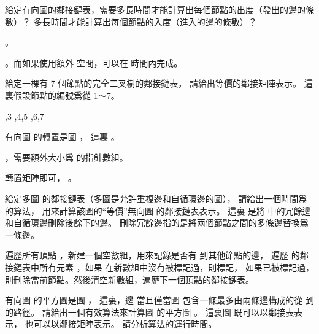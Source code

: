 \startsection[
  title={Representations of graphs},
]

\startEXERCISE
給定有向圖的鄰接鏈表，需要多長時間才能計算出每個節點的出度（發出的邊的條數）？
多長時間才能計算出每個節點的入度（進入的邊的條數）？
\stopEXERCISE

\startANSWER
{}。

。而如果使用額外  空間，可以在  時間內完成。
\stopANSWER

\startEXERCISE
給定一棵有 7 個節點的完全二叉樹的鄰接鏈表，
請給出等價的鄰接矩陣表示。
這裏假設節點的編號爲從 1～7。
\stopEXERCISE

\startANSWER
\startformulas
\startformula\startmathalignment
{} \NC {},3 \NR
{} \NC {},4,5 \NR
{} \NC {},6,7 \NR
{} \NC {} \NR
{} \NC {} \NR
{} \NC {} \NR
{} \NC {} \NR
\stopmathalignment\stopformula

\startformula\startmatrix
{}       \NR
{}       \NR
{}       \NR
{}       \NR
{}       \NR
{}       \NR
{}       \NR
\stopmatrix\stopformula
\stopformulas
\stopANSWER

\startEXERCISE
有向圖  的{\EMP 轉置}是圖 ，
這裏 。
\stopEXERCISE

\startANSWER
{}，需要額外大小爲  的指針數組。

轉置矩陣即可， 。
\stopANSWER

\startEXERCISE
給定多圖  的鄰接鏈表（多圖是允許重複邊和自循環邊的圖），
請給出一個時間爲  的算法，
用來計算該圖的“等價”無向圖  的鄰接鏈表表示。
這裏  是將  中的冗餘邊和自循環邊刪除後餘下的邊。
刪除冗餘邊指的是將兩個節點之間的多條邊替換爲一條邊。
\stopEXERCISE

\startANSWER
遍歷所有頂點 ，新建一個空數組，用來記錄是否有  到其他節點的邊，
遍歷  的鄰接鏈表中所有元素 ，如果  在新數組中沒有被標記過，則標記，
如果已被標記過，則刪除當前節點。然後清空新數組，遍歷下一個頂點的鄰接鏈表。
\stopANSWER

\startEXERCISE
有向圖  的{\EMP 平方圖}是圖 ，
這裏，邊  當且僅當圖  包含一條最多由兩條邊構成的從  到  的路徑。
請給出一個有效算法來計算圖  的平方圖 。
這裏圖  既可以以鄰接表表示，
也可以以鄰接矩陣表示。
請分析算法的運行時間。
\stopEXERCISE

